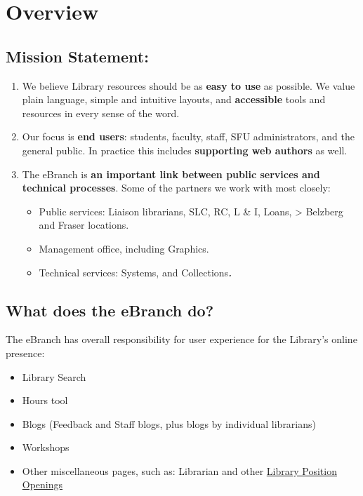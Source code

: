\documentclass[
  openany]{book}
\providecommand{\tightlist}{%
  \setlength{\itemsep}{0pt}\setlength{\parskip}{0pt}}
\begin{document}
\hypertarget{overview}{%
\chapter{Overview}\label{overview}}

\hypertarget{mission-statement}{%
\section{Mission Statement:}\label{mission-statement}}

\begin{enumerate}
\def\labelenumi{\Alph{enumi}.}
\item
  We believe Library resources should be as \textbf{easy to use} as possible. We value plain language, simple and intuitive layouts, and \textbf{accessible} tools and resources in every sense of the word.
\item
  Our focus is \textbf{end users}: students, faculty, staff, SFU administrators, and the general public. In practice this includes \textbf{supporting web authors} as well.
\item
  The eBranch is \textbf{an important link between public services and technical processes}. Some of the partners we work with most closely:

  \begin{itemize}
  \item
    Public services: Liaison librarians, SLC, RC, L \& I, Loans,
    \textgreater{} Belzberg and Fraser locations.
  \item
    Management office, including Graphics.
  \item
    Technical services: Systems, and Collections\textbf{\emph{.}}
  \end{itemize}
\end{enumerate}

\hypertarget{what-does-the-ebranch-do}{%
\section{What does the eBranch do?}\label{what-does-the-ebranch-do}}

The eBranch has overall responsibility for user experience for the
Library's online presence:

\begin{itemize}
\tightlist
\item
  Library Search
\item
  Hours tool
\item
  Blogs (Feedback and Staff blogs, plus blogs by individual librarians)
\item
  Workshops
\item
  Other miscellaneous pages, such as: Librarian and other \href{http://www.lib.sfu.ca/about/positions}{Library Position Openings}
\end{itemize}
\end{document}
